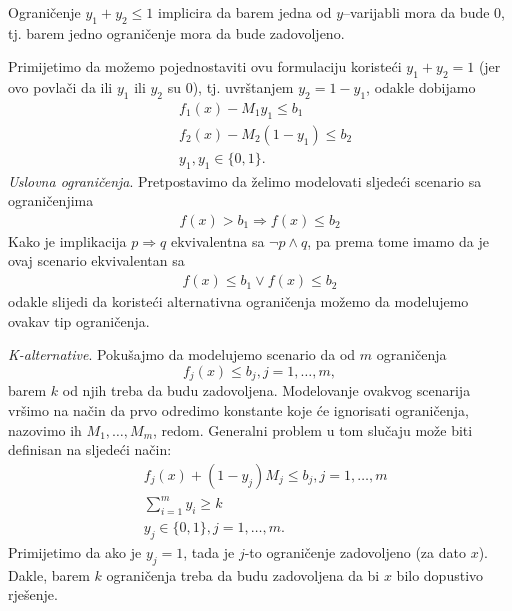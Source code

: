 \documentclass[a4paper, utf8, 11pt, colorlinks]{book}
\begin{document}
Ograničenje $y_1 + y_2 \leq 1$ implicira da barem jedna od $y$--varijabli mora da bude 0, tj. barem jedno ograničenje mora da bude zadovoljeno. 

Primijetimo da možemo  pojednostaviti ovu formulaciju koristeći $y_1 + y_2 = 1$ (jer ovo povlači da ili $y_1$ ili $y_2$ su 0), tj. uvrštanjem $y_2 =  1-y_1$, odakle dobijamo 
\begin{align*}
      & f_1(x) - M_1 y_1       \leq b_1 \\
      & f_2(x) - M_2 (1-y_1)   \leq b_2  \\
      & y_1, y_1 \in \{0,1 \}.
\end{align*}
\emph{Uslovna ograničenja}. 
Pretpostavimo da želimo modelovati sljedeći scenario sa ograničenjima 
\begin{align*}
    f(x) > b_1 \Rightarrow f(x) \leq b_2 
\end{align*}
Kako je implikacija $p \Rightarrow q$ ekvivalentna sa $\neg p \wedge q$, pa prema tome imamo da je ovaj scenario  ekvivalentan sa
\begin{align*}
    f(x) \leq b_1 \vee f(x) \leq b_2 
\end{align*}
odakle slijedi da koristeći alternativna ograničenja možemo da modelujemo ovakav tip ograničenja.

\emph{K-alternative}. Pokušajmo da modelujemo scenario da od $m$ ograničenja
$$f_j(x) \leq  b_j, j=1,\ldots,m,$$
barem $k$ od njih treba da budu zadovoljena. Modelovanje ovakvog scenarija vršimo na način da prvo odredimo konstante koje će ignorisati ograničenja, nazovimo ih $M_1, \ldots, M_m$, redom. Generalni problem u tom slučaju može biti definisan na sljedeći način:
\begin{align}
     &f_j(x) + (1-y_j) M_j \leq b_j, j=1,\ldots,m\\
     & \sum_{i=1}^m y_i \geq k \\
     & y_j \in \{0,1\}, j=1,\ldots,m.
\end{align}
Primijetimo da ako je $y_j = 1$, tada je $j$-to ograničenje zadovoljeno (za dato $x$). Dakle, barem $k$ ograničenja treba da budu zadovoljena da bi $x$ bilo dopustivo rješenje. 
\end{document}
